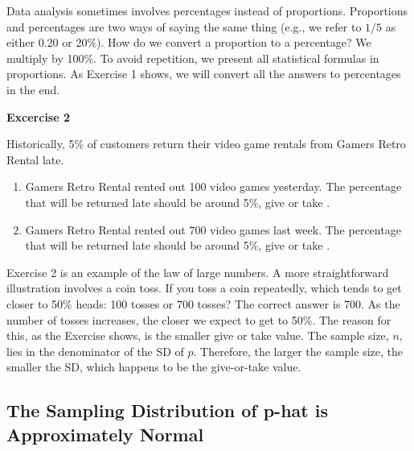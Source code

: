 \documentclass[11pt, chapterprefix=true]{scrbook}\usepackage[]{graphicx}\usepackage[]{color}
\begin{document}
Data analysis sometimes involves percentages instead of proportions.  Proportions and percentages are two ways of saying the same thing (e.g., we refer to $1/5$ as either 0.20 or 20\%).  How do we convert a proportion to a percentage?  We multiply by 100\%.  To avoid repetition, we present all statistical formulas in proportions.  As Exercise 1 shows, we will convert all the answers to percentages in the end.

\begin{minipage}[ht]{3cm}

\vspace{-45mm}

\textbf{Excercise 2}
\end{minipage}
\begin{minipage}[ht]{11cm}

\parbox{11cm}{
Historically, 5\% of customers return their video game rentals from Gamers Retro Rental late.

\begin{enumerate}
\item Gamers Retro Rental rented out 100 video games yesterday.  The percentage that will be returned late should be around 5\%, give or take \underline{\phantom{xxxxxxx}}.
\item Gamers Retro Rental rented out 700 video games last week.  The percentage that will be returned late should be around 5\%, give or take \underline{\phantom{xxxxxxx}}.
\end{enumerate}
}
\end{minipage}

Exercise 2 is an example of the law of large numbers.  A more straightforward illustration involves a coin toss.  If you toss a coin repeatedly, which tends to get closer to 50\% heads: 100 tosses or 700 tosses?  The correct answer is 700.  As the number of tosses increases, the closer we expect to get to 50\%.  The reason for this, as the Exercise shows, is the smaller give or take value.  The sample size, $n$, lies in the denominator of the SD of $\hat{p}$.  Therefore, the larger the sample size, the smaller the SD, which happens to be the give-or-take value.


\subsection{The Sampling Distribution of p-hat is Approximately Normal}
\end{document}

